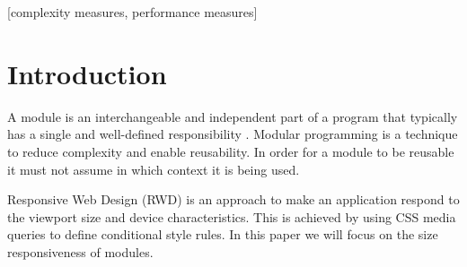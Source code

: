 \documentclass{acm_proc_article-sp}
\begin{document}
\date{10 October 2015}

\maketitle
\begin{abstract}

\end{abstract}

[complexity measures, performance measures]



\section{Introduction}

  A module is an interchangeable and independent part of a program that typically has a single and well-defined responsibility \cite{parnas1972criteria}.
  Modular programming is a technique to reduce complexity and enable reusability.
  In order for a module to be reusable it must not assume in which context it is being used.

  Responsive Web Design (RWD) is an approach to make an application respond to the viewport size and device characteristics. 
  This is achieved by using CSS media queries to define conditional style rules. In this paper we will focus on the size responsiveness of modules.
\end{document}
